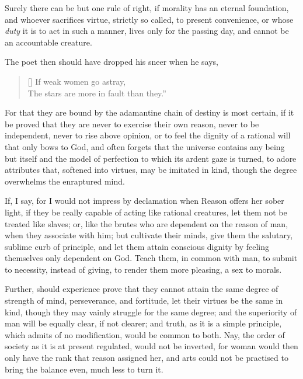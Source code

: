 Surely there can be but one rule of right, if morality has an eternal
foundation, and whoever sacrifices virtue, strictly so called, to
present convenience, or whose \textit{duty} it is to act in such a
manner, lives only for the passing day, and cannot be an accountable
creature.

The poet then should have dropped his sneer when he says,


\settowidth{}
\begin{verse}[\versewidth]
If weak women go astray,\\
The stars are more in fault than they.''
\end{verse}

\noindent For that they are bound by the adamantine chain of destiny
is most certain, if it be proved that they are never to exercise their
own reason, never to be independent, never to rise  above
opinion, or to feel the dignity of a rational will that only bows to
God, and often forgets that the universe contains any being but itself
and the model of perfection to which its ardent gaze is turned, to
adore attributes that, softened into virtues, may be imitated in kind,
though the degree overwhelms the enraptured mind.

If, I say, for I would not impress by declamation when Reason offers
her sober light, if they be really capable of acting like rational
creatures, let them not be treated like slaves; or, like the brutes
who are dependent on the reason of man, when they associate with him;
but cultivate their minds, give them the salutary, sublime curb of
principle, and let them attain conscious dignity by feeling themselves
only dependent on God. Teach them, in common with man, to submit to
necessity, instead of giving, to render them more pleasing, a sex to
morals.

Further, should experience prove that they cannot attain the same
degree of \llb strength of mind, perseverance, and fortitude, let
their virtues be the same in kind, though they may vainly struggle for
the same degree; and the superiority of man will be equally clear, if
not  clearer; and truth, as it is a simple principle, which
admits of no modification, would be common to both. Nay, the order of
society as it is at present regulated, would not be inverted, for
woman would then only have the rank that reason assigned her, and arts
could not be practised to bring the balance even, much less to turn
it.

